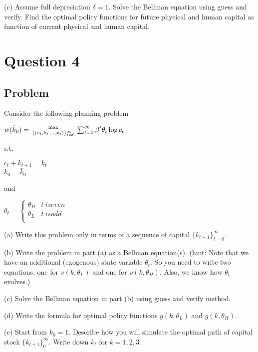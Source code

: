 \documentclass[10pt, a4paper]{article}
\begin{document}
    (c) Assume full depreciation $\delta=1$. Solve the Bellman equation using guess and verify. Find the optimal policy functions for future physical and human capital as function of current physical and human capital.
\section*{Question 4}
  \subsection*{Problem}
    Consider the following planning problem
    \begin{center}
      $w(\bar k_0)={\max\atop{\{(c_t,k_{t+1},x_t)\}_{t=0}^{\infty}}}\sum^{\infty}_{t=0}\beta^t\theta_t\log c_t$
    \end{center}
    s.t.
    \begin{center}
      $c_t+k_{t+1} = k_t$ \\
      $k_0=\bar k_0$
    \end{center}
    and
    \begin{center}
      $\theta_t = \begin{cases} 
        \theta_H & t \ {is even} \\
        \theta_L & t \ {is odd} \\
      \end{cases}$
    \end{center}
    
    (a) Write this problem only in terms of a sequence of capital $\{k_{t+1}\}_{t=0}^{\infty}$.

    (b) Write the problem in part (a) as a Bellman equation(s). (hint: Note that we have an additional (exogenous) state variable $\theta_t$. So you need to write two equations, one for $v(k,\theta_L)$ and one for $v(k,\theta_H)$. Also, we know how $\theta_t$ evolves.)

    (c) Solve the Bellman equation in part (b) using guess and verify method.

    (d) Write the formula for optimal policy functions $g(k,\theta_L)$ and $g(k,\theta_H)$.

    (e) Start from $k_0=1$. Describe how you will simulate the optimal path of capital stock $\{k_{t+1}\}_0^{\infty}$. Write down $k_t$ for $k=1,2,3$. 
\end{document}
